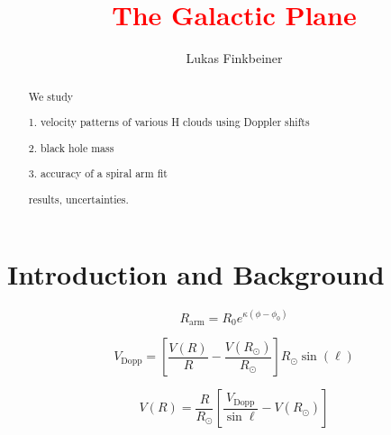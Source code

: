 \documentclass[12pt]{article}
\title{\textcolor{red}{The Galactic Plane}}
\author{Lukas Finkbeiner}
\begin{document}
\maketitle


\begin{abstract}

We study

1. velocity patterns of various H clouds using Doppler shifts

2. black hole mass

3. accuracy of a spiral arm fit

results, uncertainties.

\end{abstract}

\section{Introduction and Background}


\begin{equation} \label{eq:spiral}
R_\text{arm} = R_0 e^{\kappa(\phi - \phi_0)}
\end{equation}

\begin{equation} \label{eq:vel_dopp}
V_\text{Dopp} = \left[ \frac{V(R)}{R} - \frac{V(R_\odot)}{R_\odot} \right] R_\odot \sin(\ell)
\end{equation}



\begin{equation} \label{eq:vel_curve}
V(R) = \frac{R}{R_\odot} \left[ \frac{V_\text{Dopp}}{\sin \ell} - V(R_\odot) \right] 
\end{equation}
\end{document}

